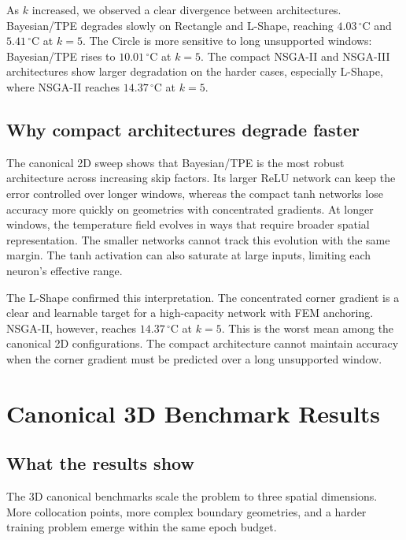 As $k$ increased, we observed a clear divergence between architectures.
Bayesian/TPE degrades slowly on Rectangle and L-Shape, reaching
$4.03\,^\circ\mathrm{C}$ and $5.41\,^\circ\mathrm{C}$ at $k=5$.
The Circle is more sensitive to long unsupported windows: Bayesian/TPE rises
to $10.01\,^\circ\mathrm{C}$ at $k=5$.
The compact NSGA-II and NSGA-III architectures show larger degradation on the
harder cases, especially L-Shape, where NSGA-II reaches
$14.37\,^\circ\mathrm{C}$ at $k=5$.

\subsection{Why compact architectures degrade faster}

The canonical 2D sweep shows that Bayesian/TPE is the most robust architecture
across increasing skip factors.
Its larger ReLU network can keep the error controlled over longer windows,
whereas the compact tanh networks lose accuracy more quickly on geometries
with concentrated gradients.
At longer windows, the temperature field evolves in ways that require broader
spatial representation.
The smaller networks cannot track this evolution with the same margin.
The tanh activation can also saturate at large inputs, limiting each neuron's
effective range.

The L-Shape confirmed this interpretation.
The concentrated corner gradient is a clear and learnable target for a
high-capacity network with FEM anchoring.
NSGA-II, however, reaches $14.37\,^\circ\mathrm{C}$ at $k=5$.
This is the worst mean among the canonical 2D configurations.
The compact architecture cannot maintain accuracy when the corner gradient
must be predicted over a long unsupported window.

\section{Canonical 3D Benchmark Results}
\label{sec:disc_3d}

\subsection{What the results show}

The 3D canonical benchmarks scale the problem to three spatial dimensions.
More collocation points, more complex boundary geometries, and a harder
training problem emerge within the same epoch budget.

